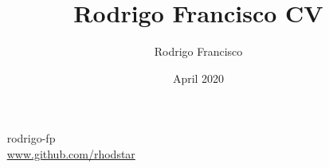 \documentclass[blue]{pastelcv}              %
\begin{document}
\title{Rodrigo Francisco CV}
\author{Rodrigo Francisco}
\date{April 2020}

\graphicspath{{assets/}}

\thispagestyle{empty}

\begin{center}
 
  \getgreyishblackfont
  {
    \small 
  \faLinkedin~ rodrigo-fp\\[2mm]
  \faGithub~ \protect\url{www.github.com/rhodstar}
  }

\end{center}

\vspace{3mm}


\end{document}
